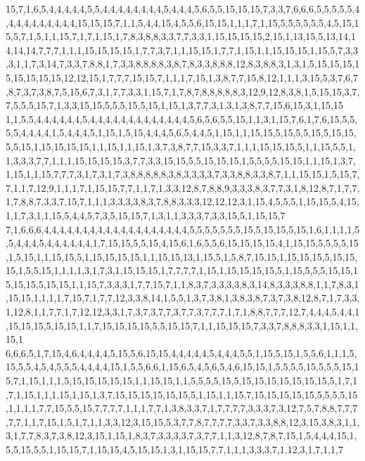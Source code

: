 15,7,1,6,5,4,4,4,4,4,5,5,4,4,4,4,4,4,4,4,5,4,4,4,5,6,5,5,15,15,15,7,3,3,7,6,6,6,5,5,5,5,5,4,4,4,4,4,4,4,4,4,4,15,15,15,7,1,1,5,4,4,15,4,5,5,6,15,15,1,1,1,7,1,15,5,5,5,5,5,5,4,5,15,15,5,7,1,5,1,1,15,7,1,7,1,15,1,7,8,3,8,8,3,3,7,7,3,3,1,15,15,15,15,2,15,1,13,15,5,13,14,14,14,14,7,7,7,1,1,1,15,15,15,15,1,7,7,3,7,1,1,15,15,1,7,7,1,15,1,1,15,15,15,1,15,5,7,3,3,3,1,1,7,3,14,7,3,3,7,8,8,1,7,3,3,8,8,8,8,3,8,7,8,3,3,8,8,8,12,8,3,8,8,3,1,3,1,5,15,15,15,15,15,15,15,15,12,12,15,1,7,7,7,15,15,7,1,1,1,7,15,1,3,8,7,7,15,8,12,1,1,1,3,15,5,3,7,6,7,8,7,3,7,3,8,7,5,15,6,7,3,1,7,7,3,3,1,15,7,1,7,8,7,8,8,8,8,8,3,12,9,12,8,3,8,1,5,15,15,3,7,7,5,5,5,15,7,1,3,3,15,15,5,5,5,15,5,15,1,15,1,3,7,7,3,1,3,1,3,8,7,7,15,6,15,3,1,15,15
1,1,5,5,4,4,4,4,4,4,5,4,4,4,4,4,4,4,4,4,4,4,4,4,5,6,5,6,5,5,15,1,1,3,1,15,7,6,1,7,6,15,5,5,5,5,4,4,4,4,1,5,4,4,4,5,1,15,1,5,15,4,4,4,5,6,5,4,4,5,1,15,1,1,15,15,5,15,5,5,15,5,15,15,5,5,15,1,15,15,15,15,1,1,15,1,1,15,1,3,7,3,8,7,7,15,3,3,7,1,1,1,15,15,15,5,1,1,15,5,5,1,1,3,3,3,7,7,1,1,1,15,15,15,15,3,7,7,3,3,15,15,5,5,15,15,15,1,5,5,5,5,15,15,1,1,15,1,3,7,1,15,1,1,15,7,7,7,3,1,7,3,1,7,3,8,8,8,8,8,3,8,3,3,3,3,7,3,3,8,8,3,3,8,7,1,1,15,15,1,5,15,7,7,1,1,7,12,9,1,1,1,7,1,15,15,7,7,1,1,7,1,3,3,12,8,7,8,8,9,3,3,3,8,3,7,7,3,1,8,12,8,7,1,7,7,1,7,8,8,7,3,3,7,15,7,1,1,1,3,3,3,3,8,3,7,8,8,3,3,3,12,12,12,3,1,15,4,5,5,5,1,15,15,5,4,15,1,1,7,3,1,1,15,5,4,4,5,7,3,5,15,15,7,1,3,1,1,3,3,3,7,3,3,15,5,1,15,15,7
7,1,6,6,6,4,4,4,4,4,4,4,4,4,4,4,4,4,4,4,4,4,4,4,5,5,5,5,5,5,5,15,5,15,15,5,15,1,6,1,1,1,1,5,5,4,4,4,5,4,4,4,4,4,4,1,7,15,15,5,5,15,4,15,6,1,6,5,5,6,15,15,15,15,4,1,15,15,5,5,5,5,15,1,5,15,1,1,15,15,5,1,15,15,15,15,1,1,15,15,13,1,15,5,1,5,8,7,15,15,1,15,15,15,5,15,15,15,1,5,5,15,1,1,1,1,3,1,7,3,1,15,15,15,1,7,7,7,7,1,15,1,15,15,15,15,5,1,15,5,5,5,15,15,15,15,15,5,15,15,1,1,15,7,3,3,3,1,7,7,15,7,1,1,8,3,7,3,3,3,3,8,3,14,8,3,3,3,8,8,1,1,7,8,3,1,15,15,1,1,1,1,7,15,7,1,7,7,12,3,3,8,14,1,5,5,1,3,7,3,8,1,3,8,3,8,7,3,7,3,8,12,8,7,1,7,3,3,1,12,8,1,1,7,7,1,7,12,12,3,3,1,7,3,7,3,7,7,3,7,7,3,7,7,7,1,7,1,8,8,7,7,7,12,7,4,4,4,5,4,4,1,15,15,15,5,15,15,1,1,7,15,15,15,15,5,5,15,15,7,1,1,15,15,15,7,3,3,7,8,8,8,3,3,1,15,1,1,15,1
6,6,6,5,1,7,15,4,6,4,4,4,4,5,15,5,6,15,15,4,4,4,4,4,5,4,4,4,5,5,1,15,5,15,1,5,5,6,1,1,1,5,15,5,5,4,5,4,5,5,5,4,4,4,4,15,1,5,5,6,6,1,15,6,5,4,5,6,5,4,6,15,15,1,5,5,5,5,15,5,5,5,15,15,7,1,15,1,1,1,5,15,15,15,15,15,1,1,15,15,1,1,5,5,5,5,15,5,15,15,15,15,15,15,15,5,1,7,1,7,1,15,1,1,1,15,1,15,1,3,7,15,15,15,15,15,15,5,1,15,1,1,15,7,15,15,15,15,15,5,5,5,5,15,1,1,1,1,7,7,15,5,5,15,7,7,7,7,1,1,1,7,7,1,3,8,3,3,7,1,7,7,7,7,3,3,3,7,3,12,7,5,7,8,8,7,7,7,7,7,1,1,7,15,1,5,1,7,1,1,3,3,12,3,15,15,5,3,7,7,8,7,7,7,7,3,3,7,3,3,8,8,12,3,15,3,8,3,1,1,3,1,7,7,8,3,7,3,8,12,3,15,1,15,1,8,3,7,3,3,3,3,7,3,7,7,1,1,3,12,8,7,8,7,15,1,5,4,4,4,15,1,5,5,15,5,5,1,15,15,7,1,15,15,4,5,15,15,1,3,1,15,15,7,7,1,1,1,3,3,3,7,1,12,3,1,7,1,1,7
